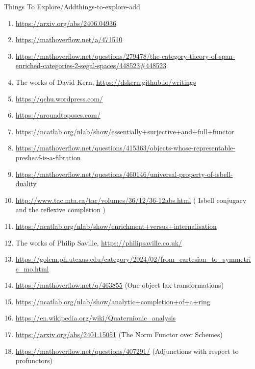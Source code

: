\begin{remark}{Things To Explore/Add}{things-to-explore-add}
\begin{enumerate}
\begin{enumerate}
                \item I wonder if one could apply an analogue of this construction to the sphere spectrum and obtain a kind of spectral version of the real numbers, as in e.g.\ following the spirit of \href{MO 443018}{https://mathoverflow.net/questions/443018}.
            \end{enumerate}
        \item \url{https://arxiv.org/abs/2406.04936}
        \item \url{https://mathoverflow.net/a/471510}
        \item \url{https://mathoverflow.net/questions/279478/the-category-theory-of-span-enriched-categories-2-segal-spaces/448523#448523}
        \item The works of David Kern, \url{https://dskern.github.io/writings}
        \item \url{https://qchu.wordpress.com/}
        \item \url{https://aroundtoposes.com/}
        \item \url{https://ncatlab.org/nlab/show/essentially+surjective+and+full+functor}
        \item \url{https://mathoverflow.net/questions/415363/objects-whose-representable-presheaf-is-a-fibration}
        \item \url{https://mathoverflow.net/questions/460146/universal-property-of-isbell-duality}
        \item \url{http://www.tac.mta.ca/tac/volumes/36/12/36-12abs.html} ( Isbell conjugacy and the reflexive completion )
        \item \url{https://ncatlab.org/nlab/show/enrichment+versus+internalisation}
        \item The works of Philip Saville, \url{https://philipsaville.co.uk/}
        \item \url{https://golem.ph.utexas.edu/category/2024/02/from\_cartesian\_to\_symmetric\_mo.html}
        \item \url{https://mathoverflow.net/q/463855} (One-object lax transformations)
        \item \url{https://ncatlab.org/nlab/show/analytic+completion+of+a+ring}
        \item \url{https://en.wikipedia.org/wiki/Quaternionic\_analysis}
        \item \url{https://arxiv.org/abs/2401.15051} (The Norm Functor over Schemes)
        \item \url{https://mathoverflow.net/questions/407291/} (Adjunctions with respect to profunctors)

\end{enumerate}
\end{remark}
